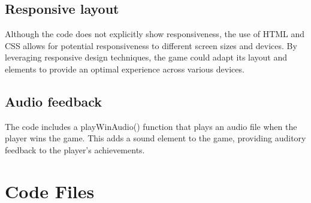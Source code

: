 \documentclass{article}
\begin{document}
\subsection*{Responsive layout}
Although the code does not explicitly show responsiveness, the use of HTML and CSS allows for potential responsiveness to different screen sizes and devices. By leveraging responsive design techniques, the game could adapt its layout and elements to provide an optimal experience across various devices.

\subsection*{Audio feedback}
The code includes a playWinAudio() function that plays an audio file when the player wins the game. This adds a sound element to the game, providing auditory feedback to the player's achievements.

\section*{Code Files}
\end{document}
